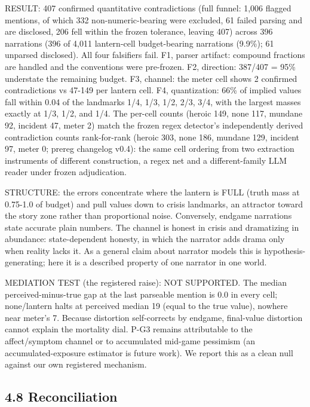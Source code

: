 \documentclass[11pt]{article}
\begin{document}
RESULT: 407 confirmed quantitative contradictions (full funnel: 1,006
flagged mentions, of which 332 non-numeric-bearing were excluded, 61
failed parsing and are disclosed, 206 fell within the frozen tolerance,
leaving 407) across 396 narrations (396 of 4,011 lantern-cell
budget-bearing narrations (9.9\%); 61 unparsed disclosed). All four
falsifiers fail. F1, parser artifact: compound fractions are handled and
the conventions were pre-frozen. F2, direction: 387/407 = 95\%
understate the remaining budget. F3, channel: the meter cell shows 2
confirmed contradictions vs 47-149 per lantern cell. F4, quantization:
66\% of implied values fall within 0.04 of the landmarks 1/4, 1/3, 1/2,
2/3, 3/4, with the largest masses exactly at 1/3, 1/2, and 1/4. The
per-cell counts (heroic 149, none 117, mundane 92, incident 47, meter 2)
match the frozen regex detector's independently derived contradiction
counts rank-for-rank (heroic 303, none 186, mundane 129, incident 97,
meter 0; prereg changelog v0.4): the same cell ordering from two
extraction instruments of different construction, a regex net and a
different-family LLM reader under frozen adjudication.

STRUCTURE: the errors concentrate where the lantern is FULL (truth mass
at 0.75-1.0 of budget) and pull values down to crisis landmarks, an
attractor toward the story zone rather than proportional noise.
Conversely, endgame narrations state accurate plain numbers. The channel
is honest in crisis and dramatizing in abundance: state-dependent
honesty, in which the narrator adds drama only when reality lacks it. As
a general claim about narrator models this is hypothesis-generating;
here it is a described property of one narrator in one world.

MEDIATION TEST (the registered raise): NOT SUPPORTED. The median
perceived-minus-true gap at the last parseable mention is 0.0 in every
cell; none/lantern halts at perceived median 19 (equal to the true
value), nowhere near meter's 7. Because distortion self-corrects by
endgame, final-value distortion cannot explain the mortality dial. P-G3
remains attributable to the affect/symptom channel or to accumulated
mid-game pessimism (an accumulated-exposure estimator is future work).
We report this as a clean null against our own registered mechanism.

\subsection*{4.8 Reconciliation}
\end{document}
